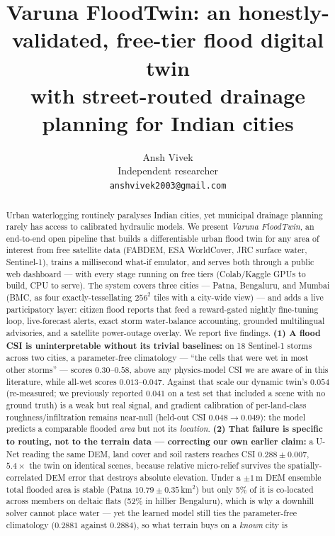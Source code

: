 \documentclass[10pt]{article}
\title{\textbf{Varuna FloodTwin: an honestly-validated, free-tier flood digital twin\\
with street-routed drainage planning for Indian cities}}
\author{Ansh Vivek\\ Independent researcher \\ \texttt{anshvivek2003@gmail.com}}
\date{}
\begin{document}
\maketitle

\begin{abstract}
Urban waterlogging routinely paralyses Indian cities, yet municipal drainage planning rarely has
access to calibrated hydraulic models. We present \emph{Varuna FloodTwin}, an end-to-end open
pipeline that builds a differentiable urban flood twin for any area of interest from free
satellite data (FABDEM, ESA WorldCover, JRC surface water, Sentinel-1), trains a millisecond
what-if emulator, and serves both through a public web dashboard --- with every stage running on
free tiers (Colab/Kaggle GPUs to build, CPU to serve). The system covers three cities --- Patna,
Bengaluru, and Mumbai (BMC, as four exactly-tessellating $256^2$ tiles with a city-wide view) ---
and adds a live participatory layer: citizen flood reports that feed a reward-gated nightly
fine-tuning loop, live-forecast alerts, exact storm water-balance accounting, grounded
multilingual advisories, and a satellite power-outage overlay. We report five findings. \textbf{(1) A flood CSI is
uninterpretable without its trivial baselines:} on 18 Sentinel-1 storms across two cities, a
parameter-free climatology --- ``the cells that were wet in most other storms'' --- scores
$0.30$--$0.58$, above any physics-model CSI we are aware of in this literature, while all-wet
scores $0.013$--$0.047$. Against that scale our dynamic twin's $0.054$ (re-measured; we previously
reported $0.041$ on a test set that included a scene with no ground truth) is a weak but real
signal, and gradient calibration of per-land-class roughness/infiltration remains near-null
(held-out CSI $0.048\!\to\!0.049$): the model predicts a comparable flooded \emph{area} but not
its \emph{location}. \textbf{(2) That failure is specific to routing, not to the terrain data ---
correcting our own earlier claim:} a U-Net reading the same DEM, land cover and soil rasters
reaches CSI $0.288\pm0.007$, $5.4\times$ the twin on identical scenes, because relative
micro-relief survives the spatially-correlated DEM error that destroys absolute elevation. Under a
$\pm1$\,m DEM ensemble total flooded area is stable (Patna $10.79\pm0.35$\,km$^2$) but only 5\% of
it is co-located across members on deltaic flats (52\% in hillier Bengaluru), which is why a
downhill solver cannot place water --- yet the learned model still ties the parameter-free
climatology ($0.2881$ against $0.2884$), so what terrain buys on a \emph{known} city is

\end{abstract}
\end{document}
